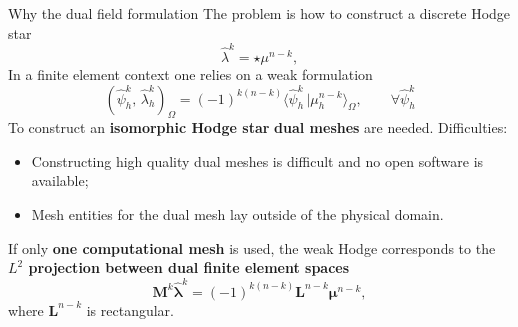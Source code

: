 \documentclass[aspectratio=169]{beamer}
\newcommand{\inpr}[3][]{\ensuremath{( #2, \, #3 )_{#1}}}
\newcommand{\dualpr}[3][]{\ensuremath{\langle #2 \, \vert #3 \rangle_{#1}}}
\newcommand*{\dual}[1]{\ensuremath{\widehat{#1}}}
\begin{document}
	\begin{frame}{Why the dual field formulation}
		The problem is how to construct a discrete Hodge star
		\begin{equation*}
			\dual{\lambda}^k = \star \mu^{n-k}, 
		\end{equation*}
		In a finite element context one relies on a weak formulation
		\begin{equation*}
			\inpr[\Omega]{\dual{\psi}^k_h}{\dual{\lambda}^k_h} = (-1)^{k(n-k)}\dualpr[\Omega]{\dual{\psi}^k_h}{\mu^{n-k}_h}, \qquad  \forall \dual{\psi}^k_h
		\end{equation*}
		To construct an \textbf{isomorphic Hodge star} \textbf{dual meshes} are needed. Difficulties:
		\begin{itemize}
			\item Constructing high quality dual meshes is difficult and no open software is available;
			\item Mesh entities for the dual mesh lay outside of the physical domain.
		\end{itemize}
		
		
		
		If only \textbf{one computational mesh} is used, the weak Hodge corresponds to the \textbf{$L^2$ projection between dual finite element spaces}
		\begin{equation*}
			\mathbf{M}^k \dual{\bm{\lambda}}^k =(-1)^{k(n-k)} \mathbf{L}^{n-k} \bm{\mu}^{n-k},
		\end{equation*}
		where $\mathbf{L}^{n-k}$ is rectangular.
	\end{frame}
	
\end{document}
